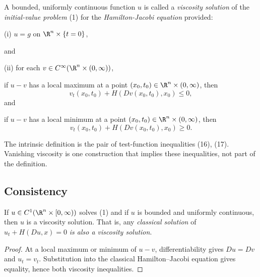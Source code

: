 \begin{definition}
\label{def:viscosity-solution-cauchy-problem}
A bounded, uniformly continuous function $u$ is called a \textit{viscosity solution} of the \textit{initial-value problem} (1) for the \textit{Hamilton-Jacobi equation} provided:

(i) $u = g$ on $\R^n \times \{t = 0\}$,

and

(ii) for each $v \in C^\infty(\R^n \times (0,\infty))$,

if $u - v$ has a local maximum at a point $(x_0, t_0) \in \R^n \times (0,\infty)$, then
\[
v_t(x_0, t_0) + H(Dv(x_0, t_0), x_0) \leq 0,
\tag{16}
\]
and

if $u - v$ has a local minimum at a point $(x_0, t_0) \in \R^n \times (0,\infty)$, then
\[
v_t(x_0, t_0) + H(Dv(x_0, t_0), x_0) \geq 0.
\tag{17}
\]
\end{definition}

\begin{remark}
\label{rem:viscosity-solution-definition-emphasis}
The intrinsic definition is the pair of test-function inequalities (16), (17). Vanishing viscosity is one construction that implies these inequalities, not part of the definition.
\end{remark}

\subsection{Consistency}

\begin{proposition}
\label{prop:classical-solutions-are-viscosity-solutions}
If $u \in C^1(\R^n \times [0,\infty))$ solves (1) and if $u$ is bounded and uniformly continuous, then $u$ is a viscosity solution. That is, any \textit{classical solution} of $u_t + H(Du,x) = 0$ \textit{is also a viscosity solution}.
\end{proposition}

\begin{proof}
\sketch At a local maximum or minimum of $u-v$, differentiability gives $Du=Dv$ and $u_t=v_t$. Substitution into the classical Hamilton--Jacobi equation gives equality, hence both viscosity inequalities.
\end{proof}

